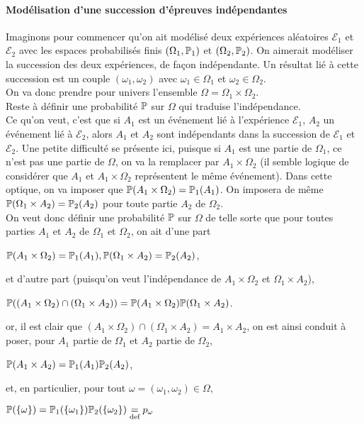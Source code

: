 \documentclass[12pt,a4paper]{report}
\begin{document}
\paragraph{Modélisation d'une succession d'épreuves indépendantes}

Imaginons pour commencer qu'on ait modélisé deux expériences aléatoires $\mathcal{E}_1$ et $\mathcal{E}_2$ avec les espaces probabilisés finis $(\Omega_1,\mathbb{P}_1)$ et $(\Omega_2,\mathbb{P}_2)$. On aimerait modéliser la succession des deux expériences, de façon indépendante. Un résultat lié à cette succession est un couple $(\omega_1,\omega_2)$ avec $\omega_1 \in \Omega_1$ et $\omega_2 \in \Omega_2$. \\
On va donc prendre pour univers l'ensemble $\Omega = \Omega_1 \times \Omega_2$. \\
Reste à définir une probabilité $\mathbb{P}$ sur $\Omega$ qui traduise l'indépendance. \\

Ce qu'on veut, c'est que si $A_1$ est un événement lié à l'expérience $\mathcal{E}_1$, $A_2$ un événement lié à $\mathcal{E}_2$, alors $A_1$ et $A_2$ sont indépendants dans la succession de $\mathcal{E}_1$ et $\mathcal{E}_2$. Une petite difficulté se présente ici, puisque si $A_1$ est une partie de $\Omega_1$, ce n'est pas une partie de $\Omega$, on va la remplacer par $A_1 \times \Omega_2$ (il semble logique de considérer que $A_1$ et $A_1 \times \Omega_2$ représentent le même événement). Dans cette optique, on va imposer que $\mathbb{P}(A_1 \times \Omega_2) = \mathbb{P}_1(A_1)$. On imposera de même $\mathbb{P}(\Omega_1 \times A_2) = \mathbb{P}_2(A_2)$ pour toute partie $A_2$ de $\Omega_2$. \\

On veut donc définir une probabilité $\mathbb{P}$ sur $\Omega$ de telle sorte que pour toutes parties $A_1$ et $A_2$ de $\Omega_1$ et $\Omega_2$, on ait d'une part
\begin{center}
$\mathbb{P}(A_1 \times \Omega_2) = \mathbb{P}_1(A_1), \mathbb{P}(\Omega_1 \times A_2) = \mathbb{P}_2(A_2)$,
\end{center}
et d'autre part (puisqu'on veut l'indépendance de $A_1 \times \Omega_2$ et $\Omega_1 \times A_2$), 
\begin{center}
$\mathbb{P}((A_1 \times \Omega_2) \cap (\Omega_1 \times A_2)) = \mathbb{P}(A_1 \times \Omega_2) \mathbb{P}(\Omega_1 \times A_2)$.
\end{center}
or, il est clair que $(A_1 \times \Omega_2) \cap (\Omega_1 \times A_2) = A_1 \times A_2$, on est ainsi conduit à poser, pour $A_1$ partie de $\Omega_1$ et $A_2$ partie de $\Omega_2$, 
\begin{center}
$\mathbb{P}(A_1 \times A_2) = \mathbb{P}_1(A_1) \mathbb{P}_2(A_2)$,
\end{center}
et, en particulier, pour tout $\omega = (\omega_1,\omega_2)\in \Omega$,
\begin{center}
$\mathbb{P}(\{\omega\}) = \mathbb{P}_1(\{\omega_1\}) \mathbb{P}_2(\{\omega_2\}) \underset{\text{def}}{=} p_\omega$
\end{center}
\end{document}
